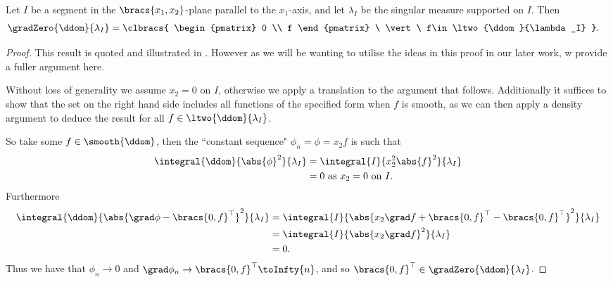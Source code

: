 \begin{prop} \label{prop:GradZeroParallelZhikov}
	Let $I$ be a segment in the $\bracs{x_1,x_2}$-plane parallel to the $x_1$-axis, and let $\lambda_I$ be the singular measure supported on $I$.
	Then 
	\begin{align*}
		\gradZero{\ddom}{\lambda_I} &= 
		\clbracs{
			\begin{pmatrix} 0 \\ f	\end{pmatrix}
			\ \vert \ f\in\ltwo{\ddom}{\lambda_I}
		}.
	\end{align*}
\end{prop}
\begin{proof}
	This result is quoted and illustrated in \cite{zhikov2000extension}.
	However as we will be wanting to utilise the ideas in this proof in our later work, w provide a fuller argument here. \newline

	Without loss of generality we assume $x_2=0$ on $I$, otherwise we apply a translation to the argument that follows.
	Additionally it suffices to show that the set on the right hand side includes all functions of the specified form when $f$ is smooth, as we can then apply a density argument to deduce the result for all $f\in\ltwo{\ddom}{\lambda_I}$. \newline
	
	So take some $f\in\smooth{\ddom}$, then the ``constant sequence" $\phi_n = \phi = x_2 f$ is such that
	\begin{align*}
		\integral{\ddom}{\abs{\phi}^2}{\lambda_I} &= \integral{I}{x_2^2\abs{f}^2}{\lambda_I} \\
		&= 0 \text{ as } x_2=0 \text{ on } I.
	\end{align*}
	Furthermore
	\begin{align*}
		\integral{\ddom}{\abs{\grad\phi - \bracs{0, f}^\top }^2}{\lambda_I}
		&= \integral{I}{\abs{ x_2\grad f + \bracs{0, f}^\top - \bracs{0,f}^\top }^2}{\lambda_I} \\
		&= \integral{I}{\abs{ x_2\grad f }^2}{\lambda_I} \\
		&= 0.
	\end{align*}
	Thus we have that $\phi_n\rightarrow0$ and $\grad\phi_n\rightarrow\bracs{0,f}^\top \toInfty{n}$, and so $\bracs{0,f}^\top\in\gradZero{\ddom}{\lambda_I}$. \newline
	

\end{proof}
